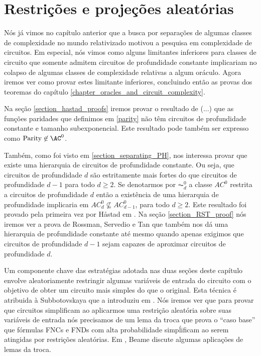 \chapter{Restrições e projeções aleatórias} \label{chapter_random_restrictions_and_projections}

Nós já vimos no capítulo anterior que a busca por separações de algumas classes de complexidade no mundo relativizado motivou a pesquisa em complexidade de circuitos. Em especial, nós vimos como alguns limitantes inferiores para classes de circuito que somente admitem circuitos de profundidade constante implicariam no colapso de algumas classes de complexidade relativas a algum oráculo. Agora iremos ver como provar estes limitante inferiores, concluindo então as provas dos teoremas do capítulo \ref{chapter_oracles_and_circuit_complexity}.

Na seção \ref{section_hastad_proofs} iremos provar o resultado de (...) que as funções paridades que definimos em \ref{parity} não têm circuitos de profundidade constante e tamanho subexponencial. Este resultado pode também ser expresso como $\Parity \not\in \AC^{0}$.

Também, como foi visto em \ref{section_separating_PH}, nos interessa provar que existe uma hierarquia de circuitos de profundidade constante. Ou seja, que circuitos de profundidade $d$ são estritamente mais fortes do que circuitos de profundidade $d - 1$ para todo $d \geq 2$. Se denotarmos por $\AC_{d}^{0}$ a classe $AC^{0}$ restrita a circuitos de profundidade $d$ então a existência de uma hierarquia de profundidade implicaria em $AC_{d}^{0} \nsubseteq AC_{d - 1}^{0}$, para todo $d \geq 2$. Este resultado foi provado pela primeira vez por H{\aa}stad em \cite{haastad1987computational}. Na seção \ref{section_RST_proof} nós iremos ver a prova de Rossman, Servedio e Tan \cite{rossman2015average} que também nos dá uma hierarquia de profundidade constante até mesmo quando apenas exigimos que circuitos de profundidade $d - 1$ sejam capazes de aproximar circuitos de profundidade $d$.

Um componente chave das estratégias adotada nas duas seções deste capítulo envolve aleatoriamente restringir algumas variáveis de entrada do circuito com o objetivo de obter um circuito mais simples do que o original. Esta técnica é atribuida à Subbotovskaya que a introduziu em \cite{subbotovskaya1961realizations}. Nós iremos ver que para provar que circuitos simplificam ao aplicarmos uma restrição aleatória sobre suas variáveis de entrada nós precisamos de um lema da troca que prova o ``caso base'' que fórmulas FNCs e FNDs com alta probabilidade simpĺificam ao serem atingidas por restrições aleatórias. Em \cite{beame1994switching}, Beame discute algumas aplicações de lemas da troca.

